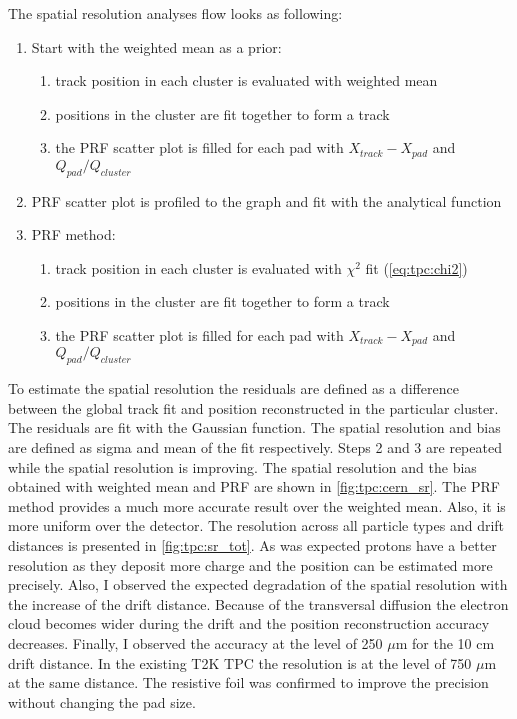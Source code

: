\documentclass[../main.tex]{subfiles}
\begin{document}
The spatial resolution analyses flow looks as following:
\begin{enumerate}
  \item Start with the weighted mean as a prior:
  \begin{enumerate}
    \item track position in each cluster is evaluated with weighted mean
    \item positions in the cluster are fit together to form a track
    \item the PRF scatter plot is filled for each pad with $X_{track} - X_{pad}$ and $Q_{pad}/Q_{cluster}$
  \end{enumerate}
  \item PRF scatter plot is profiled to the graph and fit with the analytical function
  \item PRF method:
  \begin{enumerate}
    \item track position in each cluster is evaluated with $\chi^2$ fit (\autoref{eq:tpc:chi2})
    \item positions in the cluster are fit together to form a track
    \item the PRF scatter plot is filled for each pad with $X_{track} - X_{pad}$ and $Q_{pad}/Q_{cluster}$
  \end{enumerate}
\end{enumerate}

To estimate the spatial resolution the residuals are defined as a difference between the global track fit and position reconstructed in the particular cluster. The residuals are fit with the Gaussian function. The spatial resolution and bias are defined as sigma and mean of the fit respectively. Steps 2 and 3 are repeated while the spatial resolution is improving. The spatial resolution and the bias obtained with weighted mean and PRF are shown in \autoref{fig:tpc:cern_sr}. The PRF method provides a much more accurate result over the weighted mean. Also, it is more uniform over the detector. The resolution across all particle types and drift distances is presented in \autoref{fig:tpc:sr_tot}. As was expected protons have a better resolution as they deposit more charge and the position can be estimated more precisely. Also, I observed the expected degradation of the spatial resolution with the increase of the drift distance. Because of the transversal diffusion the electron cloud becomes wider during the drift and the position reconstruction accuracy decreases. Finally, I observed the accuracy at the level of 250 $\mu\text{m}$ for the 10 cm drift distance. In the existing T2K TPC the resolution is at the level of 750 $\mu\text{m}$ at the same distance. The resistive foil was confirmed to improve the precision without changing the pad size.
\end{document}
